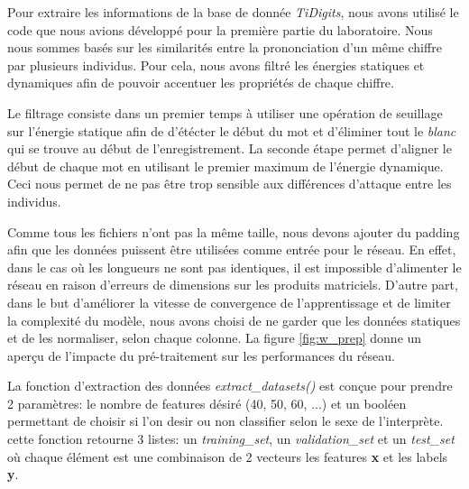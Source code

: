 \documentclass[11pt]{article}
\begin{document}
Pour extraire les informations de la base de donn\'ee {\em TiDigits}, nous avons
utilis\'e le code que nous avions d\'evelopp\'e pour la premi\`ere partie du laboratoire.
Nous nous sommes bas\'es sur les similarit\'es entre la prononciation d'un
m\^eme chiffre par plusieurs individus. Pour cela, nous avons filtr\'e
les \'energies statiques et dynamiques afin de pouvoir accentuer les
propri\'et\'es de chaque chiffre.


Le filtrage consiste dans un premier temps \`a utiliser une op\'eration de
seuillage sur l'\'energie statique afin de d'\'et\'ecter le d\'ebut du mot et
d'\'eliminer tout le {\em blanc} qui se trouve au d\'ebut de l'enregistrement.
La seconde \'etape permet d'aligner le d\'ebut de chaque mot en utilisant le
premier maximum de l'\'energie dynamique.
Ceci nous permet de ne pas \^etre trop sensible aux diff\'erences d'attaque
entre les individus.

Comme tous les fichiers n'ont pas la m\^eme taille, nous devons ajouter
du padding afin que les donn\'ees puissent \^etre utilis\'ees comme
entr\'ee pour le r\'eseau. En effet, dans le cas o\`u les longueurs ne sont pas
identiques, il est impossible d'alimenter le r\'eseau en raison d'erreurs
de dimensions sur les produits matriciels.
D'autre part, dans le but d'am\'eliorer la vitesse de convergence de
l'apprentissage et de limiter la complexit\'e du mod\`ele, nous avons choisi de
ne garder que les donn\'ees statiques et de les normaliser, selon chaque colonne.
La figure \ref{fig:w_prep} donne un aper\c cu de l'impacte du pr\'e-traitement
sur les performances du r\'eseau.

La fonction d'extraction des donn\'ees {\em extract\_datasets()}
est con\c{c}ue pour prendre 2 param\`etres: le nombre de features d\'esir\'e
(40, 50, 60, ...) et un bool\'een permettant de choisir si l'on desir ou non
classifier selon le sexe de l'interpr\`ete. cette fonction retourne 3 listes:
un {\em training\_set}, un {\em validation\_set} et un {\em test\_set} o\`u
chaque \'el\'ement est une combinaison de 2 vecteurs les features {\bf x} et les
labels {\bf y}.
\end{document}
